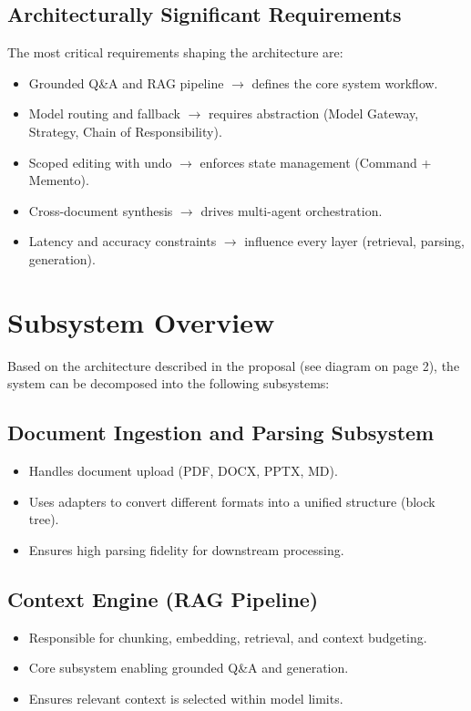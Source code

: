 \documentclass[12pt]{article}
\begin{document}
\subsection{Architecturally Significant Requirements}

The most critical requirements shaping the architecture are:

\begin{itemize}
   \item Grounded Q\&A and RAG pipeline $\rightarrow$ defines the core system workflow.
   \item Model routing and fallback $\rightarrow$ requires abstraction (Model Gateway, Strategy, Chain of Responsibility).
   \item Scoped editing with undo $\rightarrow$ enforces state management (Command + Memento).
   \item Cross-document synthesis $\rightarrow$ drives multi-agent orchestration.
   \item Latency and accuracy constraints $\rightarrow$ influence every layer (retrieval, parsing, generation).
\end{itemize}

\section{Subsystem Overview}

Based on the architecture described in the proposal (see diagram on page 2), the system can be decomposed into the following subsystems:

\subsection{Document Ingestion and Parsing Subsystem}
\begin{itemize}
   \item Handles document upload (PDF, DOCX, PPTX, MD).
   \item Uses adapters to convert different formats into a unified structure (block tree).
   \item Ensures high parsing fidelity for downstream processing.
\end{itemize}

\subsection{Context Engine (RAG Pipeline)}
\begin{itemize}
   \item Responsible for chunking, embedding, retrieval, and context budgeting.
   \item Core subsystem enabling grounded Q\&A and generation.
   \item Ensures relevant context is selected within model limits.
\end{itemize}
\end{document}

